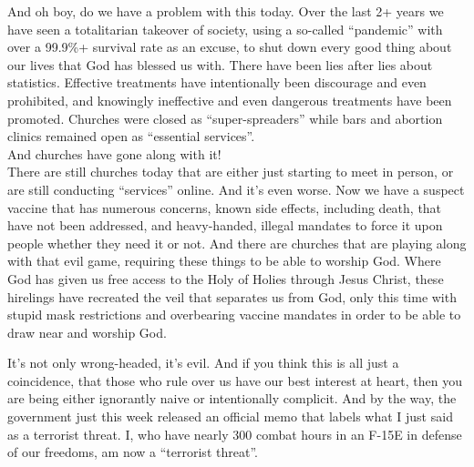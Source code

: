 \documentclass[letterpaper, 12pt]{article}
\begin{document}
    And oh boy, do we have a problem with this today. Over the last 2+
    years we have seen a totalitarian takeover of society, using a
    so-called ``pandemic'' with over a 99.9\%+ survival rate as an
    excuse, to shut down every good thing about our lives that God has
    blessed us with. There have been lies after lies about statistics.
    Effective treatments have intentionally been discourage and even
    prohibited, and knowingly ineffective and even dangerous treatments
    have been promoted. Churches were closed as ``super-spreaders'' while bars and abortion
    clinics remained open as ``essential services''. \\

    And churches have gone along with it! \\

    There are still churches today that are either just starting to meet
    in person, or are still conducting ``services'' online. And it's
    even worse. Now we have a suspect vaccine that has numerous
    concerns, known side effects, including death, that have not been
    addressed, and heavy-handed, illegal mandates to force it upon
    people whether they need it or not. And there are churches that are
    playing along with that evil game, requiring these things to be able
    to worship God.  Where God has given us free access to the Holy of
    Holies through Jesus Christ, these hirelings have recreated the veil
    that separates us from God, only this time with stupid mask
    restrictions and overbearing vaccine mandates in order to be able to
    draw near and worship God.

    It's not only wrong-headed, it's evil. And if you think this is all
    just a coincidence, that those who rule over us have our best
    interest at heart, then you are being either ignorantly naive or
    intentionally complicit. And by the way, the government just this
    week released an official memo that labels what I just said as a
    terrorist threat. I, who have nearly 300 combat hours in an F-15E in
    defense of our freedoms, am now a ``terrorist threat''.
\end{document}
